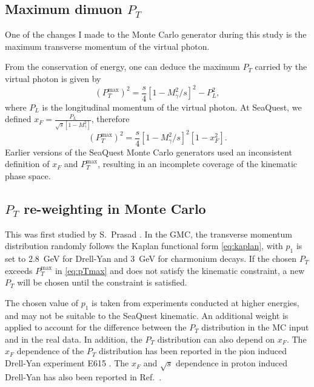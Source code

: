 \documentclass[../main.tex]{subfiles}
\begin{document}
\subsection{Maximum dimuon \texorpdfstring{$P_T$}{P\_T}}
\label{subsec:max_pt}
One of the changes I made to the Monte Carlo generator during this study
is the maximum transverse momentum of the virtual photon.

From the conservation of energy, one can deduce the maximum $P_T$ carried by the virtual photon
is given by
\begin{equation}
	\left(P_T^{\mathrm{max}}\right)^2 = \frac{s}{4} \left[1-M^2_\gamma/s\right]^2 - P_L^2,
\end{equation}
where $P_L$ is the longitudinal momentum of the virtual photon.
At SeaQuest, we defined $x_F = \frac{P_L}{\sqrt{s}\left[1-M^2_\gamma\right]}$, therefore
\begin{equation}
	\left(P_T^{\mathrm{max}}\right)^2 = \frac{s}{4} \left[1-M^2_\gamma/s\right]^2\left[1-x_F^2\right].
	\label{eq:pTmax}
\end{equation}
Earlier versions of the SeaQuest Monte Carlo generators used an inconsistent definition of $x_F$
and $P_T^{\mathrm{max}}$, resulting in an incomplete coverage of the kinematic phase space.

\subsection{\texorpdfstring{$P_T$}{P\_T} re-weighting in Monte Carlo}
\label{subsec:pt_reweight}
This was first studied by S.~Prasad \cite{prasad2020}.
In the GMC, the transverse momentum distribution randomly follows the Kaplan functional form
\cref{eq:kaplan},
with $p_1$ is set to \SI{2.8}{\GeV} for Drell-Yan and \SI{3}{\GeV} for charmonium
decays. If the chosen $P_T$ exceeds $P_T^{\mathrm{max}}$ in \cref{eq:pTmax}
and does not satisfy the kinematic constraint, a new $P_T$ will be chosen until
the constraint is satisfied.

The chosen value of $p_1$ is taken from experiments conducted at higher
energies, and may not be suitable to the SeaQuest kinematic. An additional weight is
applied to account for the difference between the $P_T$ distribution in the MC input
and in the real data. In addition, the $P_T$ distribution can also depend on $x_F$.
The $x_F$ dependence of the $P_T$ distribution has been reported in the pion induced
Drell-Yan experiment E615 \cite{conway1989}. The $x_F$ and $\sqrt{s}$ dependence in
proton induced Drell-Yan has also been reported in Ref.~\cite{prasad2020}.
\end{document}
